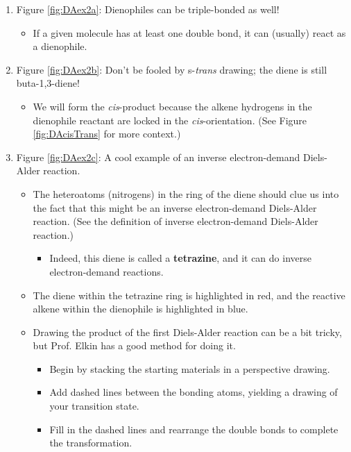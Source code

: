 \documentclass[../notes.tex]{subfiles}
\begin{document}
\begin{itemize}
\begin{figure}[h!]
    \end{figure}
    \begin{enumerate}
        \item Figure \ref{fig:DAex2a}: Dienophiles can be triple-bonded as well!
        \begin{itemize}
            \item If a given molecule has at least one double bond, it can (usually) react as a dienophile.
        \end{itemize}
        \item Figure \ref{fig:DAex2b}: Don't be fooled by s-\emph{trans} drawing; the diene is still buta-1,3-diene!
        \begin{itemize}
            \item We will form the \emph{cis}-product because the alkene hydrogens in the dienophile reactant are locked in the \emph{cis}-orientation. (See Figure \ref{fig:DAcisTrans} for more context.)
        \end{itemize}
        \pagebreak
        \item Figure \ref{fig:DAex2c}: A cool example of an inverse electron-demand Diels-Alder reaction.
        \begin{itemize}
            \item The heteroatoms (nitrogens) in the ring of the diene should clue us into the fact that this might be an inverse electron-demand Diels-Alder reaction. (See the definition of inverse electron-demand Diels-Alder reaction.)
            \begin{itemize}
                \item Indeed, this diene is called a \textbf{tetrazine}, and it can do inverse electron-demand reactions.
            \end{itemize}
            \item The diene within the tetrazine ring is highlighted in red, and the reactive alkene within the dienophile is highlighted in blue.
            \item Drawing the product of the first Diels-Alder reaction can be a bit tricky, but Prof. Elkin has a good method for doing it.
            \begin{itemize}
                \item Begin by stacking the starting materials in a perspective drawing.
                \item Add dashed lines between the bonding atoms, yielding a drawing of your transition state.
                \item Fill in the dashed lines and rearrange the double bonds to complete the transformation.

\end{itemize}
\end{itemize}
\end{enumerate}
\end{itemize}
\end{document}
